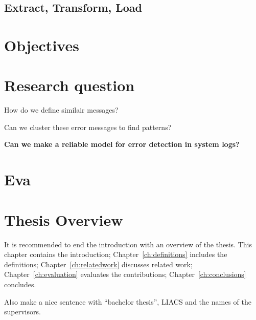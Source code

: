 \subsection{Extract, Transform, Load}


\section{Objectives}


\section{Research question}
How do we define similair messages?

Can we cluster these error messages to find patterns?


\textbf{Can we make a reliable model for error detection in system logs?}

\section{Eva}
 
\section{Thesis Overview}
It is recommended to end the introduction with an overview of the thesis. This chapter contains the introduction; Chapter~\ref{ch:definitions} includes the definitions; Chapter~\ref{ch:relatedwork} discusses related work; Chapter~\ref{ch:evaluation} evaluates the contributions; Chapter~\ref{ch:conclusions} concludes.

Also make a nice sentence with ``bachelor thesis'', LIACS and the names of the supervisors.

